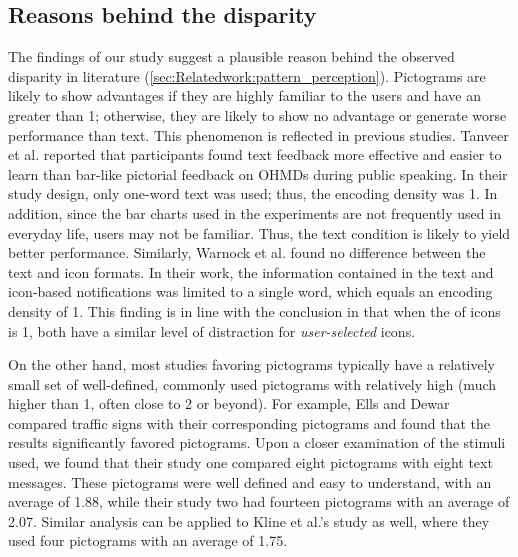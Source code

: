 \subsection{Reasons behind the disparity}
\label{sec:IconNotif:general_discussion:disparity_reasons}

The findings of our study suggest a plausible reason behind the observed disparity in literature (\autoref{sec:Relatedwork:pattern_perception}).
Pictograms are likely to show advantages if they are highly familiar to the users and have an \encodingcomplexity{} greater than 1; otherwise, they are likely to show no advantage or generate worse performance than text.  
This phenomenon is reflected in previous studies.
Tanveer et al. \cite{tanveer_rhema_2015} reported that participants found text feedback more effective and easier to learn than bar-like pictorial feedback on OHMDs during public speaking. In their study design, only one-word text was used; thus, the encoding density was 1. In addition, since the bar charts used in the experiments are not frequently used in everyday life, users may not be familiar. Thus, the text condition is likely to yield better  performance.
Similarly, Warnock et al. \cite{warnock_multiple_2013, warnock_subjective_2011} found no difference between the text and icon formats. In their work, the information contained in the text and icon-based notifications was limited to a single word, which equals an encoding density of 1.
This finding is in line with the conclusion in \studythree{} that when the \encodingcomplexity{} of icons is 1, both  have a similar level of distraction for \textit{user-selected} icons.

On the other hand, most studies favoring pictograms typically have a relatively small set of well-defined, commonly used pictograms with relatively high \encodingcomplexity{} (much higher than 1, often close to 2 or beyond). For example, Ells and Dewar \cite{ells_rapid_1979} compared traffic signs with their corresponding pictograms and found that the results significantly favored pictograms. Upon a closer examination of the stimuli used, we found that their study one compared eight pictograms with eight text messages. These pictograms were well defined and easy to understand, with an average \encodingcomplexity{} of  1.88, while their study two had fourteen pictograms with an average \encodingcomplexity{} of 2.07. Similar analysis can be applied to Kline et al.'s \cite{kline_visibility_1990} study as well, where they used four pictograms with an average \encodingcomplexity{} of 1.75. 



